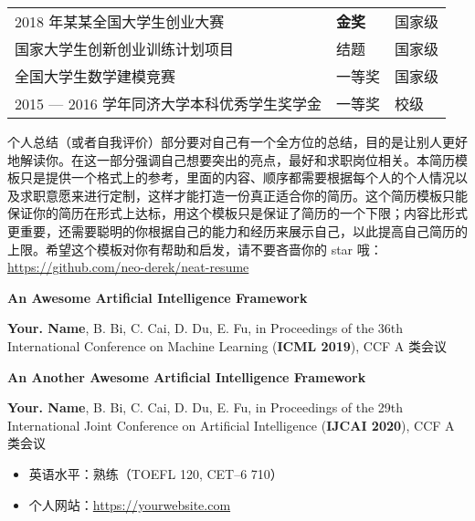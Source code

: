 \documentclass[10pt, a4paper]{article}
\begin{document}
    \setlength\tabcolsep{0pt}
    \renewcommand{\arraystretch}{1.5}
    \begin{longtable}[l]{lll}
        2018 年某某全国大学生创业大赛 & \hspace*{2em}\textbf{金奖} & \hspace*{2em}国家级\\
        
        国家大学生创新创业训练计划项目 & \hspace*{2em}结题 & \hspace*{2em}国家级\\
        
        全国大学生数学建模竞赛 & \hspace*{2em}一等奖 & \hspace*{2em}国家级\\
        
        2015 --- 2016 学年同济大学本科优秀学生奖学金 & \hspace*{2em}一等奖 & \hspace*{2em}校级\\
    \end{longtable}
    
    
    \hspace*{2em}个人总结（或者自我评价）部分要对自己有一个全方位的总结，目的是让别人更好地解读你。在这一部分强调自己想要突出的亮点，最好和求职岗位相关。本简历模板只是提供一个格式上的参考，里面的内容、顺序都需要根据每个人的个人情况以及求职意愿来进行定制，这样才能打造一份真正适合你的简历。这个简历模板只能保证你的简历在形式上达标，用这个模板只是保证了简历的一个下限；内容比形式更重要，还需要聪明的你根据自己的能力和经历来展示自己，以此提高自己简历的上限。希望这个模板对你有帮助和启发，请不要吝啬你的 star 哦：\href{https://github.com/neo-derek/neat-resume}{\courierprime\fontsize{10}{12}\selectfont https://github.com/neo-derek/neat-resume}
    
    
    \textbf{An Awesome Artificial Intelligence Framework}
    
    \textbf{Your. Name}, B. Bi, C. Cai, D. Du, E. Fu, in Proceedings of the 36th International Conference on Machine Learning (\textbf{ICML 2019}), CCF A 类会议
    
    \mydelimiter
    
    \textbf{An Another Awesome Artificial Intelligence Framework}
    
    \textbf{Your. Name}, B. Bi, C. Cai, D. Du, E. Fu, in Proceedings of the 29th International Joint Conference on Artificial Intelligence (\textbf{IJCAI 2020}), CCF A 类会议
    
    \mydelimiter
    
    
    \begin{itemize}[leftmargin=*, topsep=0pt]
        \item 英语水平：熟练（TOEFL 120, CET--6 710）
        \item 个人网站：\href{https://yourwebsite.com}{\courierprime\fontsize{10}{12}\selectfont https://yourwebsite.com}
    \end{itemize}
    
\end{document}

